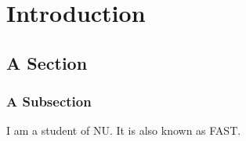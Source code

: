 \chapter{Introduction}
\label{chap:introduction}
\section{A Section}
\label{sec:abc}
\subsection{A Subsection}
I am a student of NU.  It is also known as FAST. 

